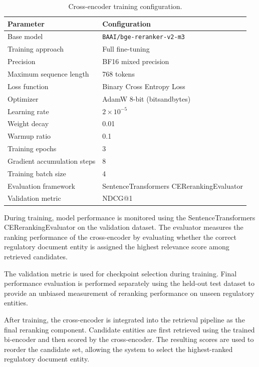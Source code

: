 \begin{table}[ht]
\centering
\caption{Cross-encoder training configuration.}
\label{tab:cross_encoder_training}
\begin{tabular}{ll}
\hline
\textbf{Parameter} & \textbf{Configuration} \\
\hline
Base model & \texttt{BAAI/bge-reranker-v2-m3} \\
Training approach & Full fine-tuning \\
Precision & BF16 mixed precision \\
Maximum sequence length & 768 tokens \\
Loss function & Binary Cross Entropy Loss \\
Optimizer & AdamW 8-bit (bitsandbytes) \\
Learning rate & $2 \times 10^{-5}$ \\
Weight decay & 0.01 \\
Warmup ratio & 0.1 \\
Training epochs & 3 \\
Gradient accumulation steps & 8 \\
Training batch size & 4 \\
Evaluation framework & SentenceTransformers CERerankingEvaluator \\
Validation metric & NDCG@1 \\
\hline
\end{tabular}
\end{table}

During training, model performance is monitored using the SentenceTransformers CERerankingEvaluator on the validation dataset. The evaluator measures the ranking performance of the cross-encoder by evaluating whether the correct regulatory document entity is assigned the highest relevance score among retrieved candidates.

The validation metric is used for checkpoint selection during training. Final performance evaluation is performed separately using the held-out test dataset to provide an unbiased measurement of reranking performance on unseen regulatory entities.

After training, the cross-encoder is integrated into the retrieval pipeline as the final reranking component. Candidate entities are first retrieved using the trained bi-encoder and then scored by the cross-encoder. The resulting scores are used to reorder the candidate set, allowing the system to select the highest-ranked regulatory document entity.
